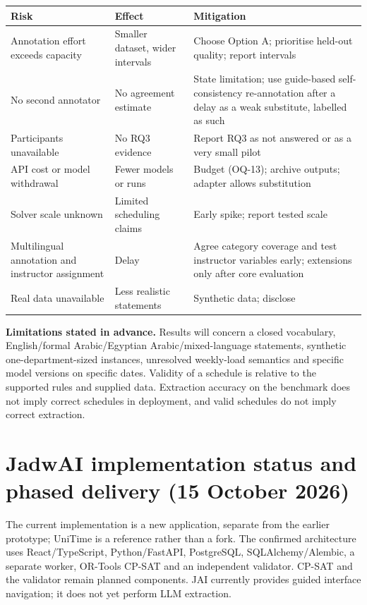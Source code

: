 \documentclass[
  11pt,a4paper,oneside]{report}
\begin{document}
\begin{longtable}[]{@{}p{\dimexpr(\linewidth-6\tabcolsep)/3\relax}p{\dimexpr(\linewidth-6\tabcolsep)/3\relax}p{\dimexpr(\linewidth-6\tabcolsep)/3\relax}@{}}
\toprule\noalign{}
Risk & Effect & Mitigation \\
\midrule\noalign{}
\endhead
\bottomrule\noalign{}
\endlastfoot
Annotation effort exceeds capacity & Smaller dataset, wider intervals &
Choose Option A; prioritise held-out quality; report intervals \\
No second annotator & No agreement estimate & State limitation; use
guide-based self-consistency re-annotation after a delay as a weak
substitute, labelled as such \\
Participants unavailable & No RQ3 evidence & Report RQ3 as not answered
or as a very small pilot \\
API cost or model withdrawal & Fewer models or runs & Budget (OQ-13);
archive outputs; adapter allows substitution \\
Solver scale unknown & Limited scheduling claims & Early spike; report
tested scale \\
Multilingual annotation and instructor assignment & Delay & Agree category coverage and test instructor variables early; extensions
only after core evaluation \\
Real data unavailable & Less realistic statements & Synthetic data;
disclose \\
\end{longtable}

\textbf{Limitations stated in advance.} Results will concern a closed
vocabulary, English/formal Arabic/Egyptian Arabic/mixed-language statements, synthetic one-department-sized instances, unresolved weekly-load semantics and
specific model versions on specific dates. Validity of a schedule is
relative to the supported rules and supplied data. Extraction accuracy
on the benchmark does not imply correct schedules in deployment, and
valid schedules do not imply correct extraction.

\section{JadwAI implementation status and phased delivery (15 October 2026)}
The current implementation is a new application, separate from the earlier prototype; UniTime is a reference rather than a fork. The confirmed architecture uses React/TypeScript, Python/FastAPI, PostgreSQL, SQLAlchemy/Alembic, a separate worker, OR-Tools CP-SAT and an independent validator. CP-SAT and the validator remain planned components. JAI currently provides guided interface navigation; it does not yet perform LLM extraction.
\end{document}
